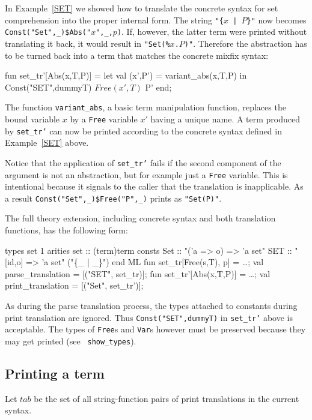 \begin{example}
  In Example~\ref{SET} we showed how to translate the concrete syntax for set
  comprehension into the proper internal form.  The string {\tt"\{$x$ |
    $P$\}"} now becomes {\tt Const("Set",_)\$Abs("$x$",_,$p$)}.  If, however,
  the latter term were printed without translating it back, it would result
  in {\tt"Set(\%$x$.$P$)"}.  Therefore the abstraction has to be turned back
  into a term that matches the concrete mixfix syntax:
\begin{ttbox}
fun set_tr'[Abs(x,T,P)] =
      let val (x',P') = variant_abs(x,T,P)
      in Const("SET",dummyT) $ Free(x',T) $ P' end;
\end{ttbox}
The function \verb$variant_abs$, a basic term manipulation function, replaces
the bound variable $x$ by a {\tt Free} variable $x'$ having a unique name.  A
term produced by {\tt set_tr'} can now be printed according to the concrete
syntax defined in Example~\ref{SET} above.

Notice that the application of {\tt set_tr'} fails if the second component of
the argument is not an abstraction, but for example just a {\tt Free}
variable.  This is intentional because it signals to the caller that the
translation is inapplicable.  As a result {\tt Const("Set",_)\$Free("P",_)}
prints as {\tt"Set(P)"}.

The full theory extension, including concrete syntax and both translation
functions, has the following form:
\begin{ttbox}
types set 1
arities set :: (term)term
consts Set :: "('a => o) => 'a set"
       SET :: "[id,o] => 'a set"  ("\{_ | _\}")
end
ML
fun set_tr[Free(s,T), p] = \dots;
val parse_translation = [("SET", set_tr)];
fun set_tr'[Abs(x,T,P)] = \dots;
val print_translation = [("Set", set_tr')];
\end{ttbox}
\end{example}
As during the parse translation process, the types attached to constants
during print translation are ignored.  Thus {\tt Const("SET",dummyT)} in
{\tt set_tr'} above is acceptable.  The types of {\tt Free}s and {\tt Var}s
however must be preserved because they may get printed (see {\tt
show_types}).


\subsection{Printing a term}

Let $tab$ be the set of all string-function pairs of print translations in the
current syntax.

